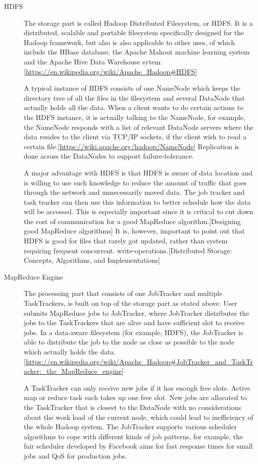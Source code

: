 \documentclass{article}
\begin{document}
\begin{description}
\item[HDFS] The storage part is called Hadoop Distributed Filesystem, or HDFS. It is a distributed, scalable and portable filesystem specifically designed for the Hadoop framework, but also is also applicable to other uses, of which include the HBase database, the Apache Mahout machine learning system and the Apache Hive Data Warehouse sytem.[\url{https://en.wikipedia.org/wiki/Apache_Hadoop#HDFS}]

A typical instance of HDFS consists of one NameNode which keeps the directory tree of all the files in the filesystem and several DataNode that actually holds all the data. When a client wants to do certain actions to the HDFS instance, it is actually talking to the NameNode, for example, the NameNode responds with a list of relevant DataNode servers where the data resides to the client via TCP/IP sockets, if the client wish to read a certain file.[\url{https://wiki.apache.org/hadoop/NameNode}] Replication is done across the DataNodes to support failure-tolerance.

A major advantage with HDFS is that HDFS is aware of data location and is willing to use such knowledge to reduce the amount of traffic that goes through the network and unnecessarily moved data. The job tracker and task tracker can then use this information to better schedule how the data will be accessed. This is especially important since it is critical to cut down the cost of communication for a good MapReduce algorithm.[Designing good MapReduce algorithms] It is, however, important to point out that HDFS is good for files that rarely got updated, rather than system requiring frequent concurrent. write-operations.[Distributed Storage: Concepts, Algorithms, and Implementations]

\item[MapReduce Engine] The processing part that consists of one JobTracker and multiple TaskTrackers, is built on top of the storage part as stated above. User submits MapReduce jobs to JobTracker, where JobTracker distributes the jobs to the TaskTrackers that are alive and have sufficient slot to receive jobs. In a data-aware filesystem (for example, HDFS), the JobTracker is able to distribute the job to the node as close as possible to the node which actually holds the data.[\url{https://en.wikipedia.org/wiki/Apache_Hadoop#JobTracker_and_TaskTracker:_the_MapReduce_engine}]

A TaskTracker can only receive new jobs if it has enough free slots. Active map or reduce task each takes up one free slot. New jobs are allocated to the TaskTracker that is closest to the DataNode with no considerations about the work load of the current node, which could lead to inefficiency of the whole Hadoop system. The JobTracker supports various scheduler algorithms to cope with different kinds of job patterns, for example, the fair scheduler developed by Facebook aims for fast response times for small jobs and QoS for production jobs.
\end{description}
\end{document}
